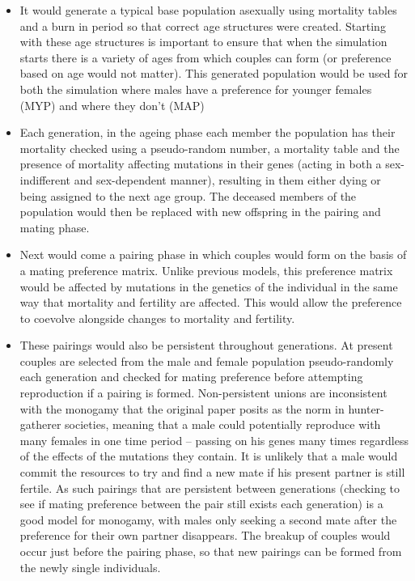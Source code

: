 \documentclass[authoryearcitations]{UoYCSproject}
\begin{document}
\begin{itemize}
\item It would generate a typical base population asexually using mortality tables and a burn in period so that correct age structures were created. Starting with these age structures is important to ensure that when the simulation starts there is a variety of ages from which couples can form (or preference based on age would not matter). This generated population would be used for both the simulation where males have a preference for younger females (MYP) and where they don't (MAP)

\item Each generation, in the ageing phase each member the population has their mortality checked using a pseudo-random number, a mortality table and the presence of mortality affecting mutations in their genes (acting in both a sex-indifferent and sex-dependent manner), resulting in them either dying or being assigned to the next age group. The deceased members of the population would then be replaced with new offspring in the pairing and mating phase.

\item Next would come a pairing phase in which couples would form on the basis of a mating preference matrix. Unlike previous models, this preference matrix would be affected by mutations in the genetics of the individual in the same way that mortality and fertility are affected. This would allow the preference to coevolve alongside changes to mortality and fertility.

\item These pairings would also be persistent throughout generations. At present couples are selected from the male and female population pseudo-randomly each generation and checked for mating preference before attempting reproduction if a pairing is formed. Non-persistent unions are inconsistent with the monogamy that the original paper posits as the norm in hunter-gatherer societies, meaning that a male could potentially reproduce with many females in one time period -- passing on his genes many times regardless of the effects of the mutations they contain. It is unlikely that a male would commit the resources to try and find a new mate if his present partner is still fertile. As such pairings that are persistent between generations (checking to see if mating preference between the pair still exists each generation) is a good model for monogamy, with males only seeking a second mate after the preference for their own partner disappears. The breakup of couples would occur just before the pairing phase, so that new pairings can be formed from the newly single individuals.


\end{itemize}
\end{document}
